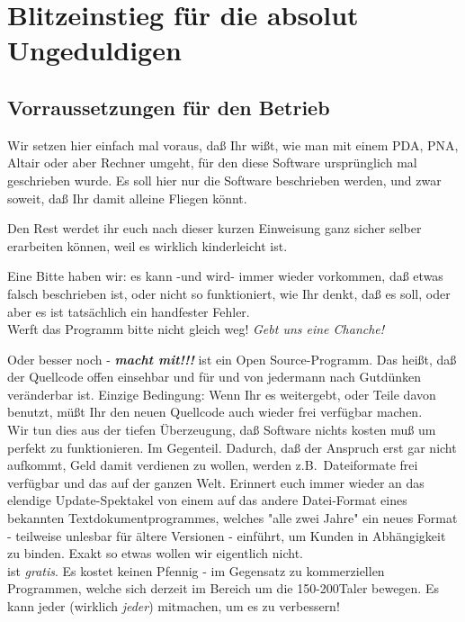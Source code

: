 \chapter{Blitzeinstieg für die absolut Ungeduldigen}\label{Blitzeinstieg}
\section{Vorraussetzungen für den Betrieb}
Wir setzen hier einfach mal voraus, daß Ihr wißt, wie man mit einem \textsf{PDA}, \textsf{PNA}, \textsf{Altair}  oder aber Rechner umgeht,  für den diese Software ursprünglich mal geschrieben wurde. Es soll hier nur die Software beschrieben werden, und zwar soweit, daß Ihr damit alleine Fliegen könnt.

Den Rest werdet ihr euch nach dieser kurzen Einweisung ganz sicher selber erarbeiten können, weil es wirklich kinderleicht ist.

Eine Bitte haben wir: es kann -und wird- immer wieder vorkommen, daß etwas falsch beschrieben ist, oder nicht so funktioniert, wie Ihr denkt, daß es soll, oder aber es ist tatsächlich ein handfester Fehler.\\[1em]

Werft das Programm bitte nicht gleich weg! \textsl{Gebt  uns eine Chanche!} 

Oder besser noch - \textsl{\textbf{macht mit!!!}} \xc ist ein Open Source-Programm. Das heißt, daß der Quellcode offen einsehbar und für und von jedermann nach Gutdünken veränderbar ist. Einzige Bedingung: Wenn Ihr es weitergebt, oder Teile davon benutzt, müßt Ihr den neuen Quellcode auch wieder frei verfügbar machen.\\


Wir tun dies aus der tiefen Überzeugung, daß Software nichts kosten muß um perfekt zu funktionieren. 
Im Gegenteil. Dadurch, daß der Anspruch erst gar nicht aufkommt, Geld damit verdienen zu wollen, werden z.B.\ Dateiformate frei verfügbar und das auf der ganzen Welt.  Erinnert euch immer wieder an das elendige Update-Spektakel von einem auf das andere Datei-Format eines bekannten Textdokumentprogrammes, welches "alle zwei Jahre" ein neues Format - teilweise unlesbar für ältere Versionen - einführt, um Kunden in Abhängigkeit zu binden. Exakt so etwas wollen wir eigentlich nicht.\\

\xc ist  \textit{gratis}. Es kostet keinen Pfennig - im Gegensatz zu kommerziellen Programmen, welche sich derzeit im Bereich um die 150-200Taler bewegen. Es kann jeder (wirklich \textsl{jeder}) mitmachen, um es zu verbessern!

